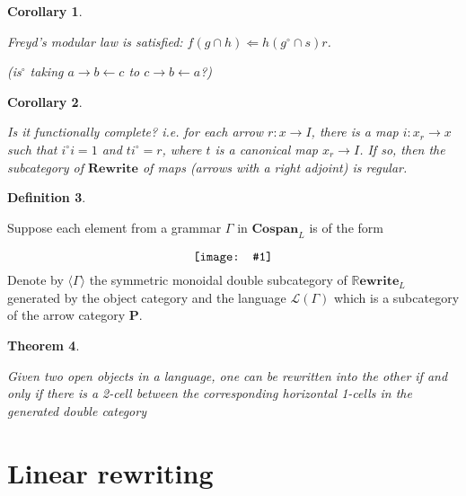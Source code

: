 \documentclass{amsart}
\renewcommand{\P}{\cat{P}}
\newcommand{\cat}[1]{\mathbf{#1}}
\newcommand{\from}{\colon}
\newcommand{\diagram}[1]{\raisebox{-0.5\height}{\texttt{[image: \#1]}}}
\newcommand{\Cospan}{\mathbf{Cospan}}
\newcommand{\Rewrite}{\mathbf{Rewrite} }
\newcommand{\RRewrite}{ \mathbb{R}\mathbf{ewrite} }
\newcommand{\edit}[1]{\textcolor{editcolour}{(#1)}}
\newtheorem{theorem}{Theorem}[section]
\newtheorem{corollary}[theorem]{Corollary}
\theoremstyle{remark}
\theoremstyle{definition}
\newtheorem{definition}[theorem]{Definition}
\begin{document}
\begin{corollary} \label{thm:bicat-rewr-freyds-modular}

  Freyd's modular law is satisfied:
  $ f (g \cap h) \Leftarrow h ( g^\circ \cap s ) r $.

  \edit{is$ ^\circ $ taking $ a \to b \gets c $ to
    $ c \to b\gets a $?}
  
\end{corollary} 

\begin{corollary} \label{thm:bicat-rewr-function-compl}

  Is it functionally complete? i.e. for each arrow
  $ r \from x \to I $, there is a map $ i \from x_r \to x $ such that
  $ i^\circ i = 1 $ and $ t i^\circ = r $, where $ t $ is a canonical
  map $ x_r \to I $. If so, then the subcategory of $ \Rewrite $ of
  maps (arrows with a right adjoint) is regular.
  
\end{corollary}

\begin{definition} \label{df:nl_gramr-gen-dblcat}
	
  Suppose each element from a grammar $ \Gamma $ in $ \Cospan_{L} $ is
  of the form
  \[
    \diagram{diag_nlr-grammar-2cell}
  \]
  Denote by $ \langle \Gamma \rangle $ the symmetric monoidal double
  subcategory of $ \RRewrite_{L} $ generated by the object category
  and the language $ \mathcal{L} ( \Gamma ) $ which is a subcategory
  of the arrow category $ \P $.
        
\end{definition}

\begin{theorem} \label{thm:nl_rewr-iff-2cell}
  
  Given two open objects in a language, one can be rewritten into the
  other if and only if there is a 2-cell between the corresponding
  horizontal 1-cells in the generated double category
  
\end{theorem}



\section{Linear rewriting} \label{sec:linear-rewriting}
\end{document}
